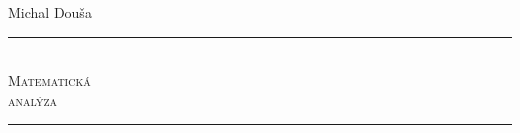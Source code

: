 \begin{titlepage}
    \hfill
    \vfill
    \raggedleft
    {\Large Michal Douša}
    \\[1cm] \hrule \hfill \\
    {\fontsize{52pt}{52pt}\selectfont \scshape Matematická\\analýza}
    \\[1.5cm] \hrule
    \vfill
\end{titlepage}
